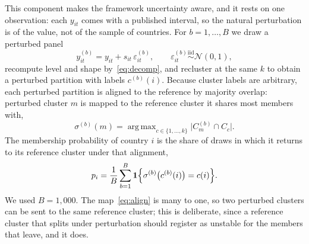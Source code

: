 \documentclass[11pt,a4paper]{article}
\DeclareMathOperator*{\argmax}{arg\,max}
\begin{document}
This component makes the framework uncertainty aware, and it rests on one observation: each $y_{it}$ comes with a published interval, so the natural perturbation is of the value, not of the sample of countries. For $b = 1, \ldots, B$ we draw a perturbed panel
\begin{equation}\label{eq:perturb}
y^{(b)}_{it} = y_{it} + s_{it}\,\varepsilon^{(b)}_{it}, \qquad \varepsilon^{(b)}_{it} \overset{\text{iid}}{\sim} \mathcal{N}(0,1),
\end{equation}
recompute level and shape by~\eqref{eq:decomp}, and recluster at the same $k$ to obtain a perturbed partition with labels $c^{(b)}(i)$. Because cluster labels are arbitrary, each perturbed partition is aligned to the reference by majority overlap: perturbed cluster $m$ is mapped to the reference cluster it shares most members with,
\begin{equation}\label{eq:align}
\sigma^{(b)}(m) = \argmax_{c \in \{1,\ldots,k\}} \bigl| C^{(b)}_m \cap C_c \bigr|.
\end{equation}
The membership probability of country $i$ is the share of draws in which it returns to its reference cluster under that alignment,
\begin{equation}\label{eq:pmember}
p_i = \frac{1}{B}\sum_{b=1}^{B} \mathbf{1}\Bigl\{ \sigma^{(b)}\bigl(c^{(b)}(i)\bigr) = c(i) \Bigr\}.
\end{equation}
We used $B = 1{,}000$. The map~\eqref{eq:align} is many to one, so two perturbed clusters can be sent to the same reference cluster; this is deliberate, since a reference cluster that splits under perturbation should register as unstable for the members that leave, and it does.
\end{document}
